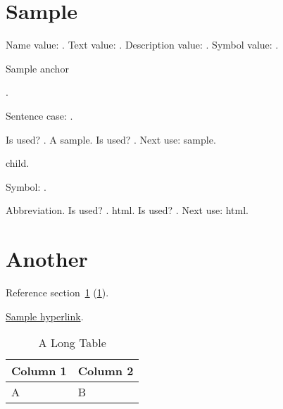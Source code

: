 \documentclass{article}
\begin{document}
\tableofcontents

\section{Sample}
\label{sec:sample}
Name value: .
Text value: .
Description value: .
Symbol value: .

\hypertarget{sampleanchor}{Sample anchor}.

Sentence case: .

Is used? .
A \gls{sample}.
Is used? .
Next use: \gls{sample}.

\Gls{child}.

Symbol: .

Abbreviation. 
Is used? .
\gls{html}.
Is used? .
Next use: \gls{html}.

\section{Another}
\label{sec:another}

Reference section~\ref{sec:sample} (\ref*{sec:sample}).

\hyperlink{sampleanchor}{Sample hyperlink}.

\begin{longtable}{ll}
\caption{A Long Table}\label{tab:sample}\\
\bfseries Column 1&\bfseries Column 2\\\endhead
A & B
\end{longtable}

\printglossaries
\end{document}

